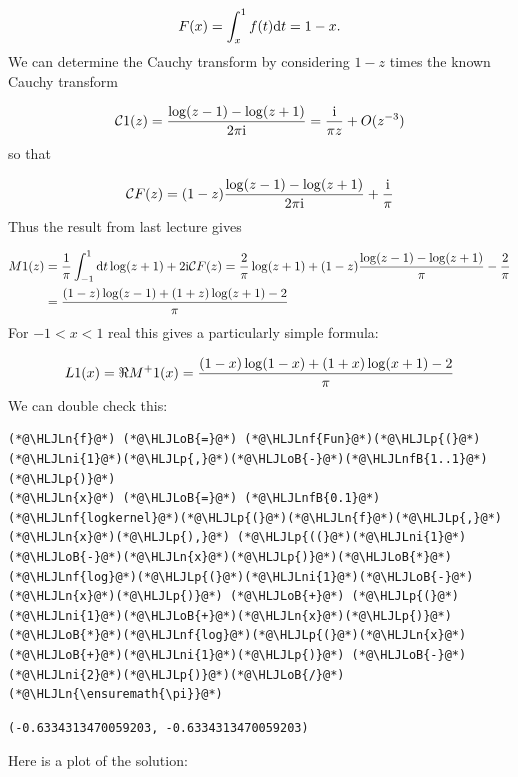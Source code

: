 \documentclass[12pt,a4paper]{article}
\newcommand{\HLJLn}[1]{#1}
\newcommand{\HLJLnf}[1]{\textcolor[RGB]{66,102,213}{#1}}
\newcommand{\HLJLnfB}[1]{\textcolor[RGB]{59,151,46}{#1}}
\newcommand{\HLJLni}[1]{\textcolor[RGB]{59,151,46}{#1}}
\newcommand{\HLJLoB}[1]{\textcolor[RGB]{102,102,102}{\textbf{#1}}}
\newcommand{\HLJLp}[1]{#1}
\def\D{ {\rm d} }
\def\I{ {\rm i} }
\def\CC{ {\cal C} }
\begin{document}
\[
F(x) = \int_x^1 f(t) \D t = 1-x.
\]
We can determine the Cauchy transform by considering $1-z$ times the known Cauchy transform

\[
\CC 1(z) = {\log(z-1) - \log(z+1) \over 2 \pi \I} = {\I  \over  \pi z} + O(z^{-3})
\]
so that

\[
\CC F(z) =  (1-z) {\log(z-1) - \log(z+1) \over 2 \pi \I} + {\I \over \pi}
\]
Thus the result from last lecture gives


\begin{align*}
M 1(z) &= {1 \over \pi} \int_{-1}^1  \D t \log(z+1)+ 2 \I \CC F(z) = {2 \over \pi} \log(z+1) + 
(1-z) {\log(z-1) - \log(z+1) \over \pi} - {2 \over \pi} \\
&= {(1-z) \log(z-1) + (1+z) \log(z+1) -2 \over \pi}
\end{align*}
For $-1 < x < 1$ real this gives a particularly simple formula:

\[
L 1(x) = \Re M^+ 1(x) = {(1-x) \log(1-x) + (1+x)\log(x+1) - 2\over \pi}
\]
We can double check this:


\begin{lstlisting}
(*@\HLJLn{f}@*) (*@\HLJLoB{=}@*) (*@\HLJLnf{Fun}@*)(*@\HLJLp{(}@*)(*@\HLJLni{1}@*)(*@\HLJLp{,}@*)(*@\HLJLoB{-}@*)(*@\HLJLnfB{1..1}@*)(*@\HLJLp{)}@*)
(*@\HLJLn{x}@*) (*@\HLJLoB{=}@*) (*@\HLJLnfB{0.1}@*)
(*@\HLJLnf{logkernel}@*)(*@\HLJLp{(}@*)(*@\HLJLn{f}@*)(*@\HLJLp{,}@*)(*@\HLJLn{x}@*)(*@\HLJLp{),}@*) (*@\HLJLp{((}@*)(*@\HLJLni{1}@*)(*@\HLJLoB{-}@*)(*@\HLJLn{x}@*)(*@\HLJLp{)}@*)(*@\HLJLoB{*}@*)(*@\HLJLnf{log}@*)(*@\HLJLp{(}@*)(*@\HLJLni{1}@*)(*@\HLJLoB{-}@*)(*@\HLJLn{x}@*)(*@\HLJLp{)}@*) (*@\HLJLoB{+}@*) (*@\HLJLp{(}@*)(*@\HLJLni{1}@*)(*@\HLJLoB{+}@*)(*@\HLJLn{x}@*)(*@\HLJLp{)}@*)(*@\HLJLoB{*}@*)(*@\HLJLnf{log}@*)(*@\HLJLp{(}@*)(*@\HLJLn{x}@*)(*@\HLJLoB{+}@*)(*@\HLJLni{1}@*)(*@\HLJLp{)}@*) (*@\HLJLoB{-}@*) (*@\HLJLni{2}@*)(*@\HLJLp{)}@*)(*@\HLJLoB{/}@*)(*@\HLJLn{\ensuremath{\pi}}@*)
\end{lstlisting}

\begin{lstlisting}
(-0.6334313470059203, -0.6334313470059203)
\end{lstlisting}


Here is a plot of the solution:
\end{document}
